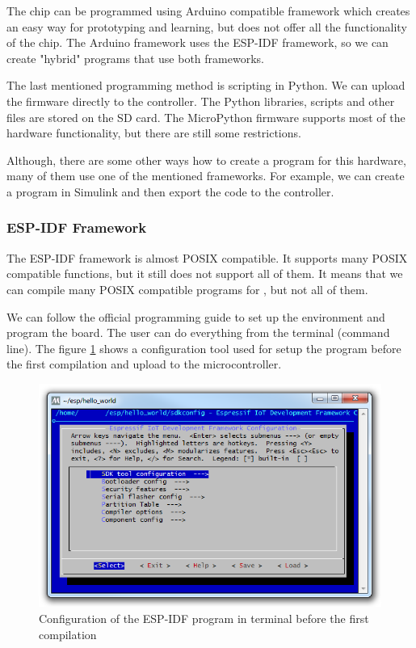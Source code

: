 The chip can be programmed using Arduino compatible framework \cite{espressif:ArduinoCore} which creates an easy way for prototyping and learning, but does not offer all the functionality of the chip. The Arduino framework uses the \ac{ESP-IDF} framework, so we can create "hybrid" programs that use both frameworks.

The last mentioned programming method is scripting in Python. We can upload the  \cite{MicroPython} firmware directly to the  controller. The Python libraries, scripts and other files are stored on the SD card. The MicroPython firmware supports most of the hardware functionality, but there are still some restrictions.

Although, there are some other ways how to create a program for this hardware, many of them use one of the mentioned frameworks. For example, we can create a program in Simulink and then export the code to the  controller. \cite{ArduinoSimulink}

\subsubsection{ESP-IDF Framework}
The \ac{ESP-IDF} framework is almost \ac{POSIX} compatible. \cite{ESP32posix} It supports many \ac{POSIX} compatible functions, but it still does not support all of them. It means that we can compile many \ac{POSIX} compatible programs for , but not all of them.

We can follow the official  programming guide \cite{ESP32programmingGuide} to set up the environment and program the board. The user can do everything from the terminal (command line). The figure \ref{ESP32menuconfig} shows a configuration tool used for setup the program before the first compilation and upload to the  microcontroller.

\begin{figure}
    \centering
    \caption{Configuration of the ESP-IDF program in terminal before the first compilation}
    \label{ESP32menuconfig}
    \includegraphics[width=\linewidth]{img/ESP32menuconfig.png}
\end{figure}


